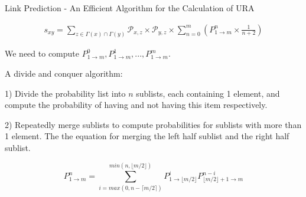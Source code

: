 \documentclass[9pt]{beamer}
\begin{document}
\begin{frame}{Link Prediction - An Efficient Algorithm for the Calculation of URA}

\begin{align*}
s_{xy}=\sum_{z\in \Gamma(x)\cap\Gamma(y)}\mathcal{P}_{x,z}\times\mathcal{P}_{y,z} \times \sum_{n=0}^{m}(P_{1\rightarrow m}^n \times \frac{1}{n+2})
\end{align*}

We need to compute $P_{1\rightarrow m}^0, P_{1\rightarrow m}^1, ..., P_{1\rightarrow m}^m$.

A divide and conquer algorithm:

1) Divide the probability list into $n$ sublists, each containing 1 element, and compute the probability of having and not having this item respectively.

2) Repeatedly merge sublists to compute probabilities for sublists with more than 1 element. The the equation for merging the left half sublist and the right half sublist.

\begin{equation}
P_{1\rightarrow m}^n=\sum_{i=max(0,n-\lceil m/2 \rceil)}^{min(n,\lfloor m/2 \rfloor)}P_{1\rightarrow{\lfloor m/2 \rfloor}}^i P_{{\lfloor m/2 \rfloor}+1\rightarrow m}^{n-i}
\end{equation}

\end{frame}
\end{document}

